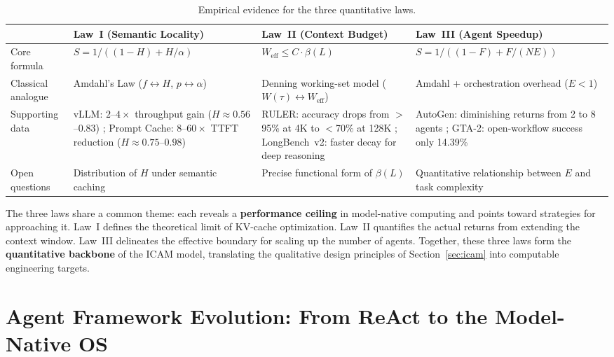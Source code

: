 \documentclass[11pt,a4paper]{article}
\begin{document}
\begin{table}[t]
\centering
\footnotesize
\caption{Empirical evidence for the three quantitative laws.}
\label{tab:empirical}
\begin{tabularx}{\textwidth}{lY Y Y}
\toprule
& Law~I (Semantic Locality) & Law~II (Context Budget) & Law~III (Agent Speedup) \\
\midrule
Core formula & $S = 1/((1-H)+H/\alpha)$ & $W_{\mathrm{eff}} \leq C \cdot \beta(L)$ & $S = 1/((1-F)+F/(NE))$ \\
Classical analogue & Amdahl's Law ($f \leftrightarrow H$, $p \leftrightarrow \alpha$) & Denning working-set model ($W(\tau) \leftrightarrow W_{\mathrm{eff}}$) & Amdahl + orchestration overhead ($E < 1$) \\
Supporting data & vLLM: $2$--$4\times$ throughput gain ($H \approx 0.56$--$0.83$) \cite{kwon2023pagedattention}; Prompt Cache: $8$--$60\times$ TTFT reduction ($H \approx 0.75$--$0.98$) \cite{gim2024promptcache} & RULER: accuracy drops from $>$95\% at 4K to $<$70\% at 128K \cite{ruler2024}; LongBench~v2: faster decay for deep reasoning \cite{longbenchv2_2024} & AutoGen: diminishing returns from 2 to 8 agents \cite{wu2023autogen}; GTA-2: open-workflow success only 14.39\% \cite{gta2_2025} \\
Open questions & Distribution of $H$ under semantic caching & Precise functional form of $\beta(L)$ & Quantitative relationship between $E$ and task complexity \\
\bottomrule
\end{tabularx}
\end{table}

The three laws share a common theme: each reveals a \textbf{performance ceiling} in model-native computing and points toward strategies for approaching it. Law~I defines the theoretical limit of KV-cache optimization. Law~II quantifies the actual returns from extending the context window. Law~III delineates the effective boundary for scaling up the number of agents. Together, these three laws form the \textbf{quantitative backbone} of the ICAM model, translating the qualitative design principles of Section~\ref{sec:icam} into computable engineering targets.




\section{Agent Framework Evolution: From ReAct to the Model-Native OS}
\label{sec:agentevolution}
\end{document}

